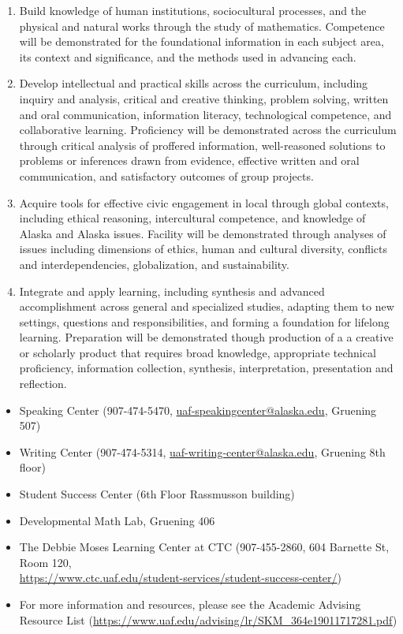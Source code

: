 \documentclass[12pt]{article}
\def\mailto#1{\href{mailto:#1}{#1}}
\begin{document}
\begin{enumerate}
\item Build knowledge of human institutions, sociocultural processes, and the physical and natural works through the study of mathematics.  Competence will be demonstrated for the foundational information in each subject area, its context and significance, and the methods used in advancing each.

\item Develop intellectual and practical skills across the curriculum, including inquiry and analysis, critical and creative thinking, problem solving, written and oral communication, information literacy, technological competence, and collaborative learning. Proficiency will be demonstrated across the curriculum through critical analysis of proffered information, well-reasoned solutions to problems or inferences drawn from evidence, effective written and oral communication, and satisfactory outcomes of group projects.

\item Acquire tools for effective civic engagement in local through global contexts, including ethical reasoning, intercultural competence, and knowledge of Alaska and Alaska issues.  Facility will be demonstrated through analyses of issues including dimensions of ethics, human and cultural diversity, conflicts and interdependencies, globalization, and sustainability.   

\item Integrate and apply learning, including synthesis and advanced accomplishment across general and specialized studies, adapting them to new settings, questions and responsibilities, and forming a foundation for lifelong learning. Preparation will be demonstrated though production of a a creative or scholarly product that requires broad knowledge, appropriate technical proficiency, information collection, synthesis, interpretation, presentation and reflection.
\end{enumerate}

\begin{itemize}
\setlength\itemsep{0em}
        \item Speaking Center (907-474-5470,
        \mailto{uaf-speakingcenter@alaska.edu}, Gruening 507)
\item Writing Center (907-474-5314, \mailto{uaf-writing-center@alaska.edu}, Gruening 8th floor)
\item Student Success Center (6th Floor Rassmusson building)
\item Developmental Math Lab, Gruening 406
\item The Debbie Moses Learning Center at CTC (907-455-2860, 604 Barnette St, Room 120,\\ \mailto{https://www.ctc.uaf.edu/student-services/student-success-center/})
\item For more information and resources, please see the Academic Advising Resource List (\url{https://www.uaf.edu/advising/lr/SKM_364e19011717281.pdf})
\end{itemize}
\end{document}
